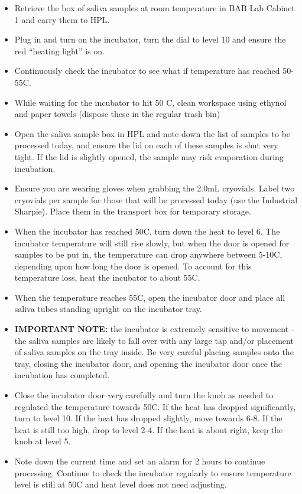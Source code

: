 \documentclass[]{book}
\providecommand{\tightlist}{%
  \setlength{\itemsep}{0pt}\setlength{\parskip}{0pt}}
\begin{document}
\begin{itemize}
\tightlist
\item
  Retrieve the box of saliva samples at room temperature in BAB Lab Cabinet 1 and carry them to HPL.
\item
  Plug in and turn on the incubator, turn the dial to level 10 and ensure the red ``heating light'' is on.
\item
  Continuously check the incubator to see what if temperature has reached 50-55C.
\item
  While waiting for the incubator to hit 50 C, clean workspace using ethynol and paper towels (dispose these in the regular trash bin)
\item
  Open the saliva sample box in HPL and note down the list of samples to be processed today, and ensure the lid on each of these samples is shut very tight. If the lid is slightly opened, the sample may risk evaporation during incubation.
\item
  Ensure you are wearing gloves when grabbing the 2.0mL cryovials. Label two cryovials per sample for those that will be processed today (use the Industrial Sharpie). Place them in the transport box for temporary storage.
\item
  When the incubator has reached 50C, turn down the heat to level 6. The incubator temperature will still rise slowly, but when the door is opened for samples to be put in, the temperature can drop anywhere between 5-10C, depending upon how long the door is opened. To account for this temperature loss, heat the incubator to about 55C.
\item
  When the temperature reaches 55C, open the incubator door and place all saliva tubes standing upright on the incubator tray.
\item
  \textbf{IMPORTANT NOTE:} the incubator is extremely sensitive to movement - the saliva samples are likely to fall over with any large tap and/or placement of saliva samples on the tray inside. Be very careful placing samples onto the tray, closing the incubator door, and opening the incubator door once the incubation has completed.
\item
  Close the incubator door \emph{very} carefully and turn the knob as needed to regulated the temperature towards 50C. If the heat has dropped significantly, turn to level 10. If the heat has dropped slightly, move towards 6-8. If the heat is still too high, drop to level 2-4. If the heat is about right, keep the knob at level 5.
\item
  Note down the current time and set an alarm for 2 hours to continue processing. Continue to check the incubator regularly to ensure temperature level is still at 50C and heat level does not need adjusting.
\end{itemize}
\end{document}
